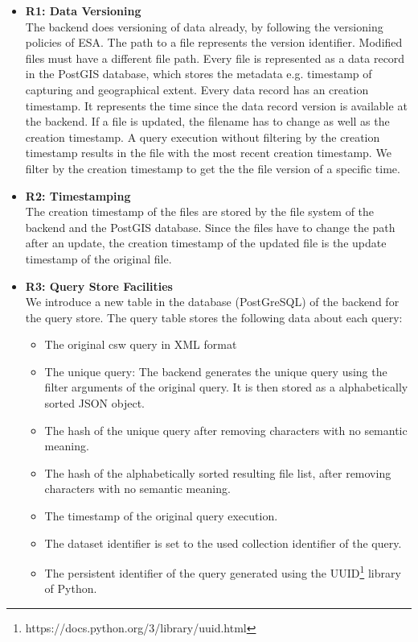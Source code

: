 \documentclass[draft,final]{vutinfth} %
\begin{document}
\begin{itemize}
	\item \textbf{R1: Data Versioning} \\
	The backend does versioning of data already, by following the versioning policies of ESA. The path to a file represents the version identifier. Modified files must have a different file path. {Every file is represented as a data record in the PostGIS database, which stores the metadata e.g. timestamp of capturing and geographical extent. Every data record has an creation timestamp. It represents the time since the data record version is available at the backend. If a file is updated, the filename has to change as well as the creation timestamp. A query execution without filtering by the creation timestamp results in the file with the most recent creation timestamp. We filter by the creation timestamp to get the the file version of a specific time.}
	\item \textbf{R2: Timestamping} \\
	The creation timestamp of the files are stored by the file system of the backend and the PostGIS database. Since the files have to change the path after an update, the creation timestamp of the updated file is the update timestamp of the original file. 
	\item \textbf{R3: Query Store Facilities} \\
	We introduce a new table in the database (PostGreSQL) of the backend for the query store. The query table stores the following data about each query:
	\begin{itemize}
		\item The original \acrshort{csw} query in XML format
		\item The unique query: The backend generates the unique query using the filter arguments of the original query. It is then stored as a alphabetically sorted JSON object. 
		\item The hash of the unique query after removing characters with no semantic meaning.
		\item The hash of the alphabetically sorted resulting file list, after removing characters with no semantic meaning. 
		\item The timestamp of the original query execution.
		\item The dataset identifier is set to the used collection identifier of the query.
		\item The persistent identifier of the query generated using the UUID\footnote{https://docs.python.org/3/library/uuid.html} library of Python.

\end{itemize}
\end{itemize}
\end{document}
